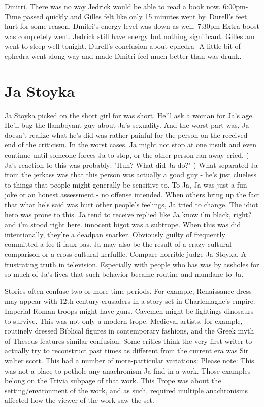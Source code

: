 \documentclass[12pt]{book}
\begin{document}
Dmitri. There was no way Jedrick would be able to read a book now. 6:00pm-Time passed quickly and Gilles felt like only 15 minutes went by. Durell's feet hurt for some reason. Dmitri's energy level was down as well. 7:30pm-Extra boost was completely went. Jedrick still have energy but nothing significant. Gilles am went to sleep well tonight. Durell's conclusion about ephedra- A little bit of ephedra went along way and made Dmitri feel much better than was drunk.



\chapter{Ja Stoyka}

Ja Stoyka picked on the short girl for was short. He'll ask a woman for Ja's age. He'll bug the flamboyant guy about Ja's sexuality. And the worst part was, Ja doesn't realize what he's did was rather painful for the person on the received end of the criticism. In the worst cases, Ja might not stop at one insult and even continue until someone forces Ja to stop, or the other person ran away cried. ( Ja's reaction to this was probably: "Huh? What did Ja do?" ) What separated Ja from the jerkass was that this person was actually a good guy - he's just clueless to things that people might generally be sensitive to. To Ja, Ja was just a fun joke or an honest assessment - no offense intended. When others bring up the fact that what he's said was hurt other people's feelings, Ja tried to change. The idiot hero was prone to this. Ja tend to receive replied like Ja know i'm black, right? and i'm stood right here. innocent bigot was a subtrope. When this was did intentionally, they're a deadpan snarker. Obviously guilty of frequently committed a fee fi faux pas. Ja may also be the result of a crazy cultural comparison or a cross cultural kerfuffle. Compare horrible judge Ja Stoyka. A frustrating truth in television. Especially with people who has was by assholes for so much of Ja's lives that such behavior became routine and mundane to Ja.



Stories often confuse two or more time periods. For example, Renaissance dress may appear with 12th-century crusaders in a story set in Charlemagne's empire. Imperial Roman troops might have guns. Cavemen might be fightings dinosaurs to survive. This was not only a modern trope. Medieval artists, for example, routinely dressed Biblical figures in contemporary fashions, and the Greek myth of Theseus features similar confusion. Some critics think the very first writer to actually try to reconstruct past times as different from the current era was Sir walter scott. This had a number of more-particular variations: Please note: This was not a place to pothole any anachronism Ja find in a work. Those examples belong on the Trivia subpage of that work. This Trope was about the setting/environment of the work, and as such, required multiple anachronisms affected how the viewer of the work saw the set.
\end{document}
